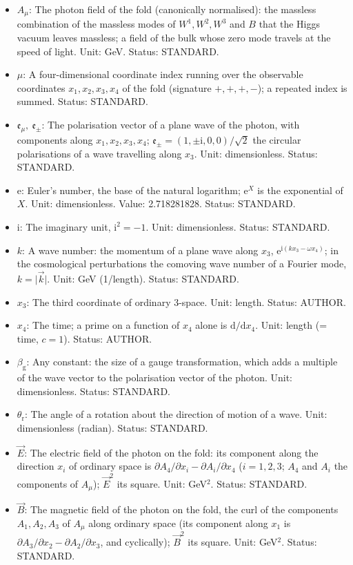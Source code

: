 \documentclass[
  10pt,
]{article}
\providecommand{\tightlist}{%
  \setlength{\itemsep}{0pt}\setlength{\parskip}{0pt}}
\begin{document}
\begin{itemize}
\tightlist
\item
  \(A_\mu\): The photon field of the fold (canonically normalised): the
  massless combination of the massless modes of \(W^1, W^2, W^3\) and
  \(B\) that the Higgs vacuum leaves massless; a field of the bulk whose
  zero mode travels at the speed of light. Unit: GeV. Status: STANDARD.
\item
  \(\mu\): A four-dimensional coordinate index running over the
  observable coordinates \(x_1, x_2, x_3, x_4\) of the fold (signature
  \(+,+,+,-\)); a repeated index is summed. Status: STANDARD.
\item
  \(\mathfrak{e}_\mu,\ \mathfrak{e}_\pm\): The polarisation vector of a
  plane wave of the photon, with components along
  \(x_1, x_2, x_3, x_4\);
  \(\mathfrak{e}_\pm = (1, \pm\mathrm{i}, 0, 0)/\sqrt2\) the circular
  polarisations of a wave travelling along \(x_3\). Unit: dimensionless.
  Status: STANDARD.
\item
  \(\mathrm{e}\): Euler's number, the base of the natural logarithm;
  \(\mathrm{e}^{X}\) is the exponential of \(X\). Unit: dimensionless.
  Value: 2.718281828. Status: STANDARD.
\item
  \(\mathrm{i}\): The imaginary unit, \(\mathrm{i}^2 = -1\). Unit:
  dimensionless. Status: STANDARD.
\item
  \(k\): A wave number: the momentum of a plane wave along \(x_3\),
  \(\mathrm{e}^{\mathrm{i}(kx_3 - \omega x_4)}\); in the cosmological
  perturbations the comoving wave number of a Fourier mode,
  \(k = \lvert\vec k\rvert\). Unit: GeV (1/length). Status: STANDARD.
\item
  \(x_3\): The third coordinate of ordinary 3-space. Unit: length.
  Status: AUTHOR.
\item
  \(x_4\): The time; a prime on a function of \(x_4\) alone is
  \(\mathrm{d}/\mathrm{d}x_4\). Unit: length (= time, \(c = 1\)).
  Status: AUTHOR.
\item
  \(\beta_{\mathrm{g}}\): Any constant: the size of a gauge
  transformation, which adds a multiple of the wave vector to the
  polarisation vector of the photon. Unit: dimensionless. Status:
  STANDARD.
\item
  \(\theta_{\mathrm{r}}\): The angle of a rotation about the direction
  of motion of a wave. Unit: dimensionless (radian). Status: STANDARD.
\item
  \(\vec E\): The electric field of the photon on the fold: its
  component along the direction \(x_i\) of ordinary space is
  \(\partial A_4/\partial x_i - \partial A_i/\partial x_4\)
  (\(i = 1, 2, 3\); \(A_4\) and \(A_i\) the components of \(A_\mu\));
  \(\vec E^2\) its square. Unit: GeV\(^2\). Status: STANDARD.
\item
  \(\vec B\): The magnetic field of the photon on the fold, the curl of
  the components \(A_1, A_2, A_3\) of \(A_\mu\) along ordinary space
  (its component along \(x_1\) is
  \(\partial A_3/\partial x_2 - \partial A_2/\partial x_3\), and
  cyclically); \(\vec B^2\) its square. Unit: GeV\(^2\). Status:
  STANDARD.
\end{itemize}
\end{document}
